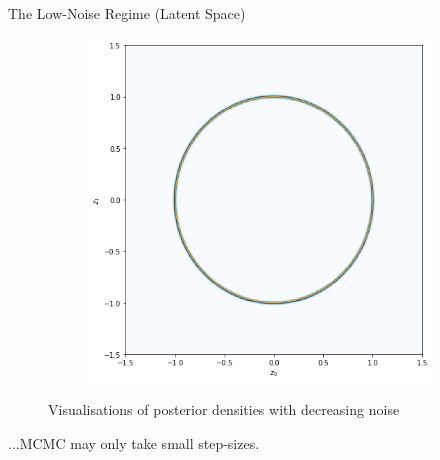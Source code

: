 \documentclass[10pt]{beamer}
\begin{document}
\begin{frame}[fragile]{The Low-Noise Regime (Latent Space)}
\begin{figure}
\begin{subfigure}[b]{0.3\textwidth}
        \end{subfigure}%
        \begin{subfigure}[b]{0.3\textwidth}
            \includegraphics[width=\textwidth]{manifold_low_noise.png}
        \end{subfigure}
        \caption{Visualisations of posterior densities with decreasing noise}
    \end{figure}
   
    ...MCMC may only take \alert{small step-sizes.}
    
\end{frame}
\end{document}
